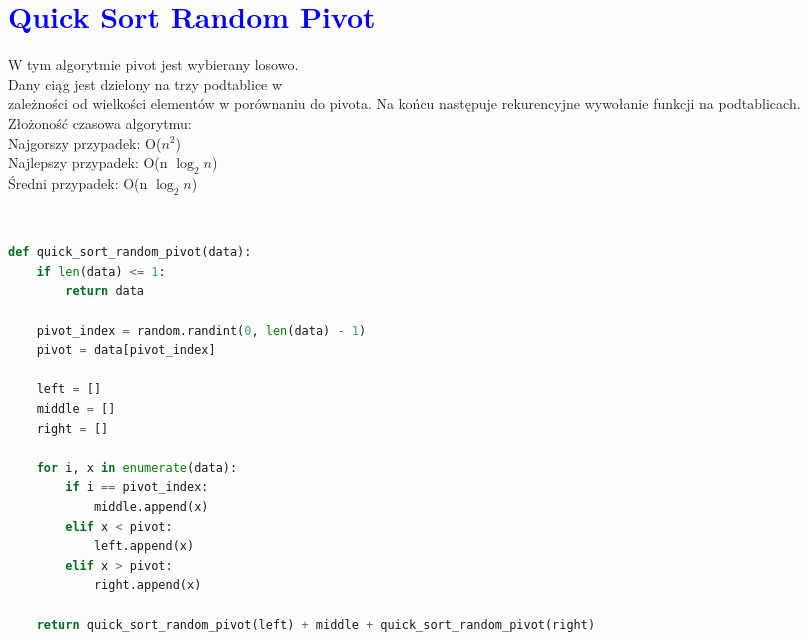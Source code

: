 \documentclass{article}
\begin{document}
	\section*{\textcolor{blue}{Quick Sort Random Pivot}}
	\begin{multicols}{2}
		\noindent W tym algorytmie pivot jest wybierany losowo. \\Dany ciąg jest dzielony na trzy podtablice w \\zależności od wielkości elementów w porównaniu do pivota. Na końcu następuje rekurencyjne wywołanie funkcji na podtablicach.
		\\Złożoność czasowa algorytmu: \\ Najgorszy przypadek: O($n^2$) \\Najlepszy przypadek: O(n $\log_2 n$) \\ Średni przypadek: O(n $\log_2 n$)
		
		\noindent 
		\begin{tcolorbox}[colback=black,colframe=gray!50!,arc=3mm,boxrule=0pt,left=0pt,right=0pt,width=\linewidth]
			\textcolor{white}{\textbf{\textsf{Terminal}}}\\
			
			\begin{lstlisting}[language=Python]
def quick_sort_random_pivot(data):
	if len(data) <= 1:
		return data

	pivot_index = random.randint(0, len(data) - 1)
	pivot = data[pivot_index]

	left = []
	middle = []
	right = []

	for i, x in enumerate(data):
		if i == pivot_index:
			middle.append(x)
		elif x < pivot:
			left.append(x)
		elif x > pivot:
			right.append(x)

	return quick_sort_random_pivot(left) + middle + quick_sort_random_pivot(right)

			\end{lstlisting}
			
		\end{tcolorbox}
	\end{multicols}
	
	\newpage
	
	
\end{document}
